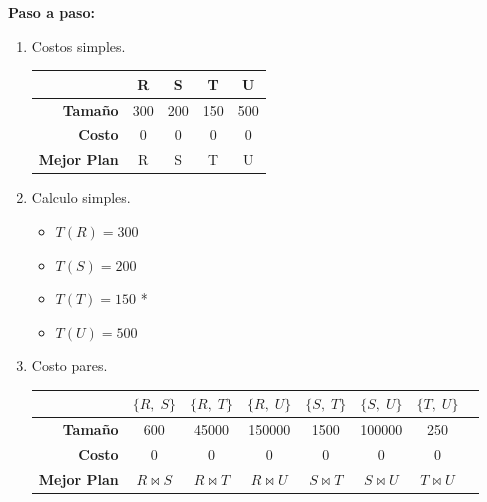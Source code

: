 \documentclass{templateNote}
\newcommand{\newparagraph}{\par\vspace{\baselineskip}\noindent}
\begin{document}
\begin{enumerate}
    \textbf{Paso a paso:}
    \begin{enumerate}[label=\arabic*)]
        \item Costos simples.
        \begin{center}
            \begin{tabular}{|r|c|c|c|c|}
                \hline
                & R & S & T & U \\
                \hline
                \textbf{Tamaño} & 300 & 200 & 150 & 500 \\
                \hline
                \textbf{Costo}  & 0 & 0 & 0 & 0 \\
                \hline
                \textbf{Mejor Plan} & R & S & T & U \\
                \hline
            \end{tabular}
        \end{center}
        \newparagraph

        \item Calculo simples.
        \newparagraph
        \begin{minipage}{0.5\textwidth}
            \begin{itemize}
                \item $T(R) = 300$
                \item $T(S) = 200$
            \end{itemize}
        \end{minipage}
        \hfill
        \begin{minipage}{0.5\textwidth}
            \begin{itemize}
                \item $T(T) = 150$ *
                \item $T(U) = 500$
            \end{itemize}
        \end{minipage}
        \newparagraph

        \item Costo pares.
        \begin{center}
            \begin{tabular}{|r|c|c|c|c|c|c|c|}
                \hline
                & $\{R, \; S\}$ & $\{R, \; T\}$ & $\{R, \; U\}$ & $\{S, \; T\}$ & $\{S, \; U\}$ & $\{T, \; U\}$ \\
                \hline
                \textbf{Tamaño} & 600 & 45000 & 150000 & 1500 & 100000 & 250 \\
                \hline
                \textbf{Costo}  & 0 & 0 & 0 & 0 & 0 & 0 \\
                \hline
                \textbf{Mejor Plan} & $R \Join S$ & $R \Join T$ & $R \Join U$ & $S \Join T$ & $S \Join U$ & $T \Join U$ \\
                \hline
            \end{tabular}
        \end{center}
        \newparagraph


\end{enumerate}
\end{enumerate}
\end{document}
